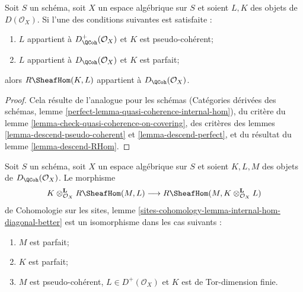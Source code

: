 \begin{lemma}
\label{lemma-quasi-coherence-internal-hom}
Soit $S$ un sch\'ema, soit $X$ un espace alg\'ebrique sur $S$ et soient $L,K$
des objets de $D(\mathcal{O}_X)$. Si l'une des conditions suivantes est
satisfaite :
\begin{enumerate}
\item $L$ appartient \`a $D^+_\QCoh(\mathcal{O}_X)$ et $K$ est
pseudo-coh\'erent;
\item $L$ appartient \`a $D_\QCoh(\mathcal{O}_X)$ et $K$ est parfait;
\end{enumerate}
alors $R\SheafHom(K,L)$ appartient \`a $D_\QCoh(\mathcal{O}_X)$.
\end{lemma}

\begin{proof}
Cela r\'esulte de l'analogue pour les sch\'emas (Cat\'egories d\'eriv\'ees des
sch\'emas, lemme \ref{perfect-lemma-quasi-coherence-internal-hom}), du crit\`ere
du lemme \ref{lemma-check-quasi-coherence-on-covering}, des crit\`eres des
lemmes \ref{lemma-descend-pseudo-coherent} et \ref{lemma-descend-perfect},
et du r\'esultat du lemme \ref{lemma-descend-RHom}.
\end{proof}

\begin{lemma}
\label{lemma-internal-hom-evaluate-tensor-isomorphism}
Soit $S$ un sch\'ema, soit $X$ un espace alg\'ebrique sur $S$ et soient
$K,L,M$ des objets de $D_\QCoh(\mathcal{O}_X)$. Le morphisme
$$
K \otimes_{\mathcal{O}_X}^\mathbf{L} R\SheafHom(M, L)
\longrightarrow
R\SheafHom(M, K \otimes_{\mathcal{O}_X}^\mathbf{L} L)
$$
de Cohomologie sur les sites, lemme
\ref{sites-cohomology-lemma-internal-hom-diagonal-better}
est un isomorphisme dans les cas suivants :
\begin{enumerate}
\item $M$ est parfait;
\item $K$ est parfait;
\item $M$ est pseudo-coh\'erent, $L \in D^+(\mathcal{O}_X)$ et $K$ est de
Tor-dimension finie.
\end{enumerate}
\end{lemma}

